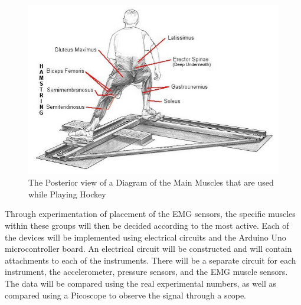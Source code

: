 \begin{figure}[htbp]
\centering
\includegraphics[scale =0.4]{Project_Proposal/figs/blog-muscles-used-for-skating-the-skating-anatomy-02.jpg}
\caption{The Posterior view of a Diagram of the Main Muscles that are 
used while Playing Hockey\cite{6}}
\label{fig:back}
\end{figure}

\par
Through experimentation of placement of the EMG sensors, the specific muscles within these groups will then be decided according to the most active. Each of the devices will be implemented using electrical circuits and the Arduino Uno microcontroller board. An electrical circuit will be constructed and will contain attachments to each of the instruments. There will be a separate circuit for each instrument, the accelerometer, pressure sensors, and the EMG muscle sensors. The data will be compared using the real experimental numbers, as well as compared using a Picoscope to observe the signal through a scope.
